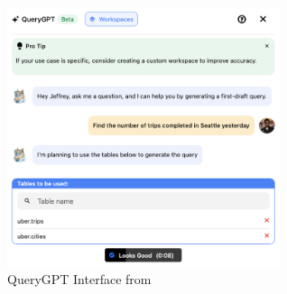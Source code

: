         \begin{figure}[H]
            \centering
            \includegraphics[width=8cm]{chapters/2/figures/query-gpt-ui.png}
            \caption[QueryGPT Interface]{QueryGPT Interface  from~\cite{QueryGPT}}
            \label{fig:query-gpt-interface}
        \end{figure}


